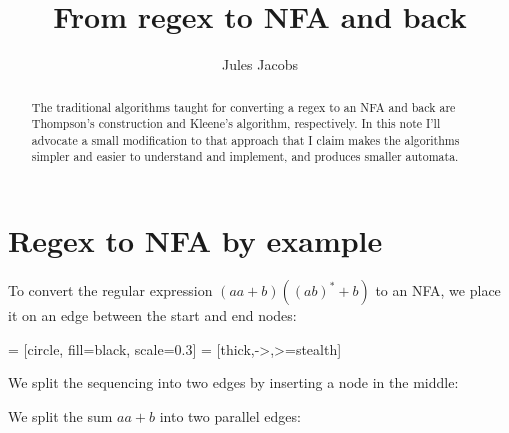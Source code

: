 \documentclass[a4paper, 11pt]{article}
\title{From regex to NFA and back}
\author{Jules Jacobs}
\theoremstyle{definition}
\begin{document}
\maketitle

\begin{abstract}
  The traditional algorithms taught for converting a regex to an NFA and back are Thompson's construction and Kleene's algorithm, respectively. In this note I'll advocate a small modification to that approach that I claim makes the algorithms simpler and easier to understand and implement, and produces smaller automata.
\end{abstract}

\section{Regex to NFA by example}

To convert the regular expression $(aa+b)((ab)^* + b)$ to an NFA, we place it on an edge between the start and end nodes:

 = [circle, fill=black, scale=0.3]
 = [thick,->,>=stealth]
\newcommand{\state}[2]{\node[n] at (#1) (#2) {};}
\newcommand{\edge}[3]{\draw [arrow] (#1) -- (#2) node[midway,above] {#3};}
\newcommand{\edgeb}[4]{\draw [arrow, bend #4] (#1) edge (#2) node[midway,above] {#3};}

\begin{center}
\end{center}

\noindent We split the sequencing into two edges by inserting a node in the middle:

\begin{center}
\end{center}

\noindent We split the sum $aa + b$ into two parallel edges:

\begin{center}
\end{center}
\end{document}

